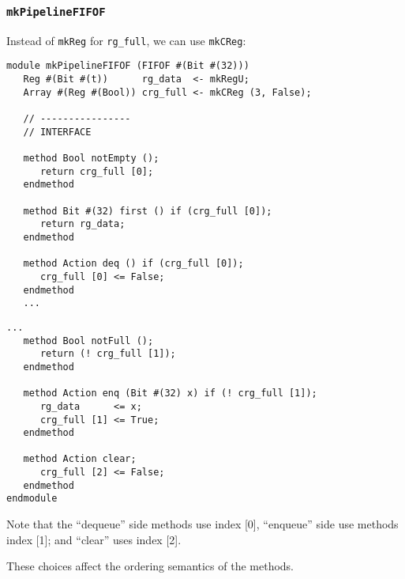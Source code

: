 \begin{frame}[fragile]
\frametitle{{\tt mkPipelineFIFOF}}

\label{mkPipelineFIFOF}

\footnotesize

Instead of {\tt mkReg} for {\tt rg\_full}, we can use {\tt mkCReg}:

\begin{center}
\begin{minipage}[t]{0.485\textwidth}\scriptsize
\begin{Verbatim}[frame=single]
module mkPipelineFIFOF (FIFOF #(Bit #(32)))
   Reg #(Bit #(t))      rg_data  <- mkRegU;
   Array #(Reg #(Bool)) crg_full <- mkCReg (3, False);

   // ----------------
   // INTERFACE

   method Bool notEmpty ();
      return crg_full [0];
   endmethod

   method Bit #(32) first () if (crg_full [0]);
      return rg_data;
   endmethod

   method Action deq () if (crg_full [0]);
      crg_full [0] <= False;
   endmethod
   ...
\end{Verbatim}
\end{minipage}
\begin{minipage}[t]{0.485\textwidth}\scriptsize
\begin{Verbatim}[frame=single]
   ...
   method Bool notFull ();
      return (! crg_full [1]);
   endmethod

   method Action enq (Bit #(32) x) if (! crg_full [1]);
      rg_data      <= x;
      crg_full [1] <= True;
   endmethod

   method Action clear;
      crg_full [2] <= False;
   endmethod
endmodule
\end{Verbatim}

\vspace{1ex}

Note that the ``dequeue'' side methods use index [0], ``enqueue'' side
use methods index [1]; and ``clear'' uses index [2].

\vspace{1ex}

These choices affect the ordering semantics of the methods.

\end{minipage}
\end{center}

\end{frame}


